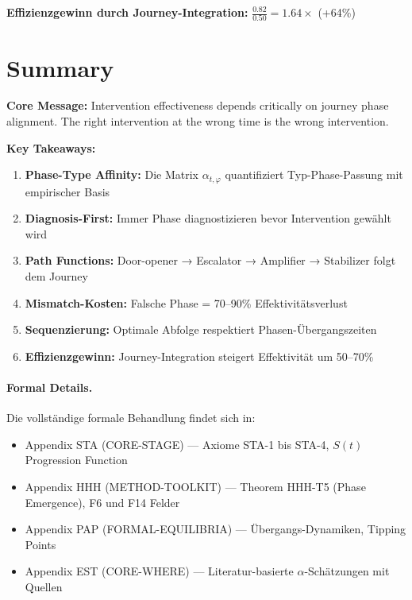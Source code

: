 \textbf{Effizienzgewinn durch Journey-Integration:} $\frac{0.82}{0.50} = 1.64\times$ (+64\%)


\section{Summary}
\label{sec:18-summary}

\begin{tcolorbox}[colback=green!10!white, colframe=green!75!black,
    title=Key Points]

\textbf{Core Message:} Intervention effectiveness depends critically on journey phase alignment. The right intervention at the wrong time is the wrong intervention.

\textbf{Key Takeaways:}
\begin{enumerate}
\item \textbf{Phase-Type Affinity:} Die Matrix $\alpha_{t,\varphi}$ quantifiziert Typ-Phase-Passung mit empirischer Basis
\item \textbf{Diagnosis-First:} Immer Phase diagnostizieren bevor Intervention gewählt wird
\item \textbf{Path Functions:} Door-opener → Escalator → Amplifier → Stabilizer folgt dem Journey
\item \textbf{Mismatch-Kosten:} Falsche Phase = 70--90\% Effektivitätsverlust
\item \textbf{Sequenzierung:} Optimale Abfolge respektiert Phasen-Übergangszeiten
\item \textbf{Effizienzgewinn:} Journey-Integration steigert Effektivität um 50--70\%
\end{enumerate}

\end{tcolorbox}

\paragraph{Formal Details.}
Die vollständige formale Behandlung findet sich in:
\begin{itemize}[nosep]
\item Appendix STA (CORE-STAGE) --- Axiome STA-1 bis STA-4, $S(t)$ Progression Function
\item Appendix HHH (METHOD-TOOLKIT) --- Theorem HHH-T5 (Phase Emergence), F6 und F14 Felder
\item Appendix PAP (FORMAL-EQUILIBRIA) --- Übergangs-Dynamiken, Tipping Points
\item Appendix EST (CORE-WHERE) --- Literatur-basierte $\alpha$-Schätzungen mit Quellen
\end{itemize}

